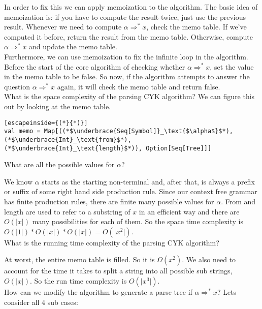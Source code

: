 \documentclass[12pt, letterpaper]{article}
\begin{document}
In order to fix this we can apply memoization to the algorithm. The basic idea of memoization is: if you have to compute the result twice, just use the previous result. Whenever we need to compute \(\alpha \Rightarrow^* x\), check the memo table. If we've computed it before, return the result from the memo table. Otherwise, compute \(\alpha \Rightarrow^* x\) and update the memo table.\\

Furthermore, we can use memoization to fix the infinite loop in the algorithm. Before the start of the core algorithm of checking whether \(\alpha \Rightarrow^* x\), set the value in the memo table to be false. So now, if the algorithm attempts to answer the question \(\alpha \Rightarrow^* x\) again, it will check the memo table and return false.\\

What is the space complexity of the parsing CYK algorithm? We can figure this out by looking at the memo table.

\begin{lstlisting}[escapeinside={(*}{*)}]
val memo = Map[((*$\underbrace{Seq[Symbol]}_\text{$\alpha$}$*), (*$\underbrace{Int}_\text{from}$*), (*$\underbrace{Int}_\text{length}$*)), Option[Seq[Tree]]]
\end{lstlisting}

What are all the possible values for \(\alpha\)? 

We know \(\alpha\) starts as the starting non-terminal and, after that, is always a prefix or suffix of some right hand side production rule. Since our context free grammar has finite production rules, there are finite many possible values for \(\alpha\). From and length are used to refer to a substring of \(x\) in an efficient way and there are \(O(\vert x \vert)\) many possibilities for each of them. So the space time complexity is \(O(\vert 1 \vert) * O(\vert x \vert) * O(\vert x \vert) = O(\vert x^2 \vert)\).\\

What is the running time complexity of the parsing CYK algorithm? 

At worst, the entire memo table is filled. So it is \(\Omega(x^2)\). We also need to account for the time it takes to split a string into all possible sub strings, \(O(\vert x \vert)\). So the run time complexity is \(O(\vert x^3 \vert)\).\\

How can we modify the algorithm to generate a parse tree if \(\alpha \Rightarrow^* x\)? Lets consider all 4 sub cases:
\end{document}
